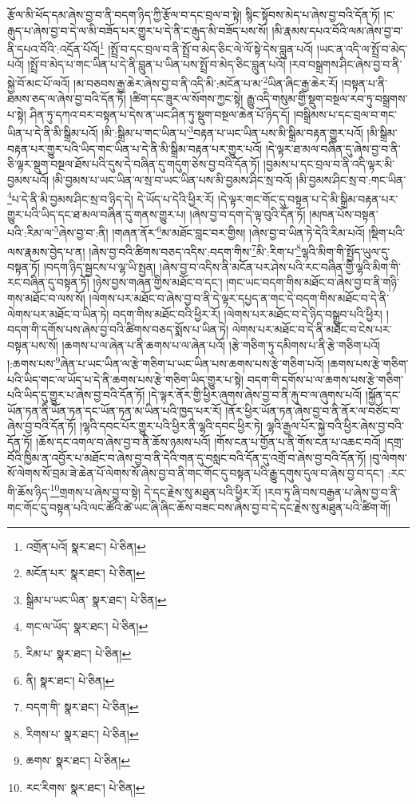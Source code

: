 རྩོལ་མི་ཕོད་དམ་ཞེས་བྱ་བ་ནི་བདག་ཉིད་ཀྱི་རྩོལ་བ་དང་བྲལ་བ་སྟེ། སྙིང་སྟོབས་མེད་པ་ཞེས་བྱ་བའི་དོན་ཏོ། །ང་རྒུད་པ་ཞེས་བྱ་བ་དེ་ལ་མི་བཟོད་པར་གྱུར་པ་དེ་ནི་ང་རྒུད་མི་བཟོད་པས་སོ། །མི་རྣམས་དཔའ་བོའི་ལམ་ཞེས་བྱ་བ་ནི་དཔའ་བོའི་:འདྲོན་པོའོ།\footnote{འགྲོན་པའོ།  སྣར་ཐང་།  པེ་ཅིན། } །སྤྲོ་བ་དང་བྲལ་བ་ནི་སྤྲོ་བ་མེད་ཅིང་ལེ་ལོ་སྟེ་དེས་བླུན་པའོ། །ཡང་ན་འདི་ལ་སྤྲོ་བ་མེད་པའོ། །སྤྲོ་བ་མེད་པ་གང་ཡིན་པ་དེ་ནི་བླུན་པ་ཡིན་པས་སྤྲོ་བ་མེད་ཅིང་བླུན་པའོ། །རབ་བསྒྲགས་ཤིང་ཞེས་བྱ་བ་ནི་སྐྱེ་བོ་མང་པོ་ལའོ། །མ་བཅབས་རྒྱ་ཆེར་ཞེས་བྱ་བ་ནི་འདི་མི་:མངོན་པ་མ་\footnote{མངོན་པར་  སྣར་ཐང་།  པེ་ཅིན། }ཡིན་ཞིང་རྒྱ་ཆེར་རོ། །བསྟན་པ་ནི་ཐམས་ཅད་ལ་ཞེས་བྱ་བའི་དོན་ཏོ། །ཚིག་དང་ཟུར་ལ་སོགས་ཀྱང་སྟེ། རྒྱུ་འདི་གསུམ་གྱི་སྡུག་བསྔལ་རབ་ཏུ་བསྒྲགས་པ་སྟེ། ཤིན་ཏུ་དཀའ་བར་བསྟན་པ་དེས་ན་ཡང་ཤིན་ཏུ་སྡུག་བསྔལ་ཆེན་པོ་ཉིད་དོ། །བསྒྲིམས་པ་དང་བྲལ་བ་གང་ཡིན་པ་དེ་ནི་མི་སྒྲིམ་པའོ། །མི་:སྒྲིམ་པ་གང་ཡིན་པ་\footnote{སྒྲིམ་པ་ཡང་ཡིན་  སྣར་ཐང་།  པེ་ཅིན། }བརྟན་པ་ཡང་ཡིན་པས་མི་སྒྲིམ་བརྟན་གྱུར་པའོ། །མི་སྒྲིམ་བརྟན་པར་གྱུར་པའི་ཡིད་གང་ཡིན་པ་དེ་ནི་མི་སྒྲིམ་བརྟན་པར་གྱུར་པའོ། །དེ་ལྟར་ཐ་མལ་བཞིན་དུ་ཞེས་བྱ་བ་ནི་ཅི་ལྟར་སྡུག་བསྔལ་ཐོས་པའི་དུས་དེ་བཞིན་དུ་གདུག་ཅེས་བྱ་བའི་དོན་ཏོ། །བྱམས་པ་དང་བྲལ་བ་ནི་འདི་ལྟར་མི་བྱམས་པའོ། །མི་བྱམས་པ་ཡང་ཡིན་ལ་སྲ་བ་ཡང་ཡིན་པས་མི་བྱམས་ཤིང་སྲ་བའོ། །མི་བྱམས་ཤིང་སྲ་བ་:གང་ཡིན་\footnote{གང་ལ་ཡོད་  སྣར་ཐང་།  པེ་ཅིན། }པ་དེ་ནི་མི་བྱམས་ཤིང་སྲ་བ་ཉིད་དེ། དེ་ཡོད་པ་དེའི་ཕྱིར་རོ། །དེ་ལྟར་གང་གོང་དུ་བསྟན་པ་དེ་མི་སྒྲིམ་བརྟན་པར་གྱུར་པའི་ཡིད་དང་ཐ་མལ་བཞིན་དུ་གནས་གྱུར་པ། །ཞེས་བྱ་བ་དག་དེ་ལྟ་བུའི་དོན་ཏོ། །མཁན་པོས་བསྟན་པའི་:རིམ་ལ་\footnote{རིམ་པ་  སྣར་ཐང་།  པེ་ཅིན། }ཞེས་བྱ་བ་:ནི། །གཞན་ནོར་\footnote{ནི།   སྣར་ཐང་།  པེ་ཅིན། }མ་མཐོང་བླང་བར་གྱིས། །ཞེས་བྱ་བ་ཡིན་ཏེ་དེའི་རིམ་པའོ། །སྡིག་པའི་ལས་རྣམས་བྱེད་པ་ན། །ཞེས་བྱ་བའི་ཚིགས་བཅད་འདིས་:བདག་གིས་\footnote{བདག་གི་  སྣར་ཐང་།  པེ་ཅིན། }མི་:རིག་པ་\footnote{རིགས་པ་  སྣར་ཐང་།  པེ་ཅིན། }ལྷའི་མིག་གི་སྤྱོད་ཡུལ་དུ་བསྟན་ཏོ། །བདག་ཉིད་སྦྱངས་པ་ལྷ་ཡི་སྤྱན། །ཞེས་བྱ་བ་འདིས་ནི་མངོན་པར་ཤེས་པའི་རང་བཞིན་གྱི་ལྷའི་མིག་གི་རང་བཞིན་དུ་བསྟན་ཏོ། །ཉེས་བྱས་གཞན་གྱིས་མཐོང་བ་དང་། །གང་ཡང་བདག་གིས་མཐོང་བ་ཞེས་བྱ་བ་ནི་གཉི་གས་མཐོང་བ་ལས་སོ། །ལེགས་པར་མཐོང་བ་ཞེས་བྱ་བ་ནི་དེ་ལྟར་དཔྱད་ན་གང་དེ་བདག་གིས་མཐོང་བ་དེ་ནི་ལེགས་པར་མཐོང་བ་ཡིན་ཏེ། བདག་གིས་མཐོང་བའི་ཕྱིར་རོ། །ལེགས་པར་མཐོང་བ་དེ་ཉིད་བསྒྲུབ་པའི་ཕྱིར། །བདག་གི་དགོས་པས་ཞེས་བྱ་བའི་ཚིགས་བཅད་སྨོས་པ་ཡིན་ཏེ། ལེགས་པར་མཐོང་བ་དེ་ནི་མཐོང་བ་ངེས་པར་བསྟན་པས་སོ། །ཆགས་པ་ལ་ཞེན་པ་ནི་ཆགས་པ་ལ་ཞེན་པའོ། །རྩེ་གཅིག་ཏུ་དམིགས་པ་ནི་རྩེ་གཅིག་པའོ། །:ཆགས་པས་\footnote{ཆགས་  སྣར་ཐང་།  པེ་ཅིན། }ཞེན་པ་ཡང་ཡིན་ལ་རྩེ་གཅིག་པ་ཡང་ཡིན་པས་ཆགས་པས་རྩེ་གཅིག་པའོ། །ཆགས་པས་རྩེ་གཅིག་པའི་ཡིད་གང་ལ་ཡོད་པ་དེ་ནི་ཆགས་པས་རྩེ་གཅིག་ཡིད་གྱུར་པ་སྟེ། བདག་གི་དགོས་པ་ལ་ཆགས་པས་རྩེ་གཅིག་པའི་ཡིད་དུ་གྱུར་པ་ཞེས་བྱ་བའི་དོན་ཏོ། །དེ་ལྟར་ནོར་གྱི་ཕྱིར་ཞུགས་ཞེས་བྱ་བ་ནི་རྐུ་བ་ལ་ཞུགས་པའོ། །སྐྱོན་དང་ཡོན་ཏན་ནི་ཡོན་ཏན་དང་ཡོན་ཏན་མ་ཡིན་པའི་ཁྱད་པར་རོ། །ནོར་ཕྱིར་ཡོན་ཏན་ཞེས་བྱ་བ་ནི་ནོར་ལ་བཙོང་བ་ཞེས་བྱ་བའི་དོན་ཏོ། །ལྷའི་དབང་པོར་གྱུར་པའི་ཕྱིར་ནི་ལྷའི་དབང་ཕྱིར་ཏེ། ལྷའི་རྒྱལ་པོར་སྐྱེ་བའི་ཕྱིར་ཞེས་བྱ་བའི་དོན་ཏོ། །ཆོས་དང་འགལ་བ་ཞེས་བྱ་བ་ནི་ཆོས་ཉམས་པའོ། །གོས་ངན་པ་གྱོན་པ་ནི་གོས་ངན་པ་འཆང་བའོ། །དགྲ་བོའི་ཁྱིམ་ན་འབྱོར་པ་མཐོང་བ་ཞེས་བྱ་བ་ནི་དེའི་གན་དུ་བསླང་བའི་དོན་དུ་འགྲོ་བ་ཞེས་བྱ་བའི་དོན་ཏོ། །བུ་ལེགས་སོ་ལེགས་སོ་བྲམ་ཟེ་ཆེན་པོ་ལེགས་སོ་ཞེས་བྱ་བ་ནི་གང་གོང་དུ་བསྟན་པའི་རྒྱུ་དགུས་དུལ་བ་ཞེས་བྱ་བ་དང་། :རང་གི་ཆོས་ཉིད་\footnote{རང་རིགས་  སྣར་ཐང་།  པེ་ཅིན། }གྲགས་པ་ཞེས་བྱ་བ་སྟེ། དེ་དང་རྗེས་སུ་མཐུན་པའི་ཕྱིར་རོ། །རབ་ཏུ་ཞི་བས་བརྒྱན་པ་ཞེས་བྱ་བ་ནི་གང་གོང་དུ་བསྟན་པའི་ལང་ཚོའི་ཚེ་ཡང་ཞི་ཞིང་ཆོས་བཟང་བས་ཞེས་བྱ་བ་དེ་དང་རྗེས་སུ་མཐུན་པའི་ཚིག་གོ། 